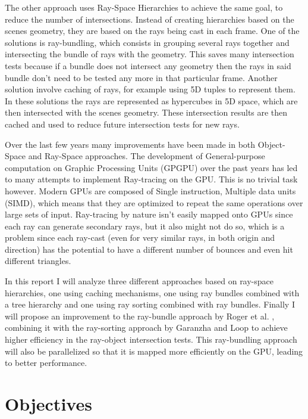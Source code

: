 \documentclass{llncs}
\begin{document}
\medskip

The other approach uses Ray-Space Hierarchies to achieve the same goal, to reduce the number of intersections. Instead of creating hierarchies based on the scenes geometry, they are based on the rays being cast in each frame. One of the solutions is ray-bundling, which consists in grouping several rays together and intersecting the bundle of rays with the geometry. This saves many intersection tests because if a bundle does not intersect any geometry then the rays in said bundle don't need to be tested any more in that particular frame. Another solution involve caching of rays, for example using 5D tuples to represent them. In these solutions the rays are represented as hypercubes in 5D space, which are then intersected with the scenes geometry. These intersection results are then cached and used to reduce future intersection tests for new rays.

\medskip

Over the last few years many improvements have been made in both Object-Space and Ray-Space approaches. The development of General-purpose computation on Graphic Processing Units (GPGPU) over the past years has led to many attempts to implement Ray-tracing on the GPU. This is no trivial task however. Modern GPUs are composed of Single instruction, Multiple data units (SIMD), which means that they are optimized to repeat the same operations over large sets of input. Ray-tracing by nature isn't easily mapped onto GPUs since each ray can generate secondary rays, but it also might not do so, which is a problem since each ray-cast (even for very similar rays, in both origin and direction) has the potential to have a different number of bounces and even hit different triangles.

\medskip

In this report I will analyze three different approaches based on ray-space hierarchies, one using caching mechanisms, one using ray bundles combined with a tree hierarchy and one using ray sorting combined with ray bundles. Finally I will propose an improvement to the ray-bundle approach by Roger et al. \cite{Roger07}, combining it with the ray-sorting approach by Garanzha and Loop \cite{GaranzhaLoop10} to achieve higher efficiency in the ray-object intersection tests. This ray-bundling approach will also be parallelized so that it is mapped more efficiently on the GPU, leading to better performance.

%
\section{Objectives}
%
\end{document}
